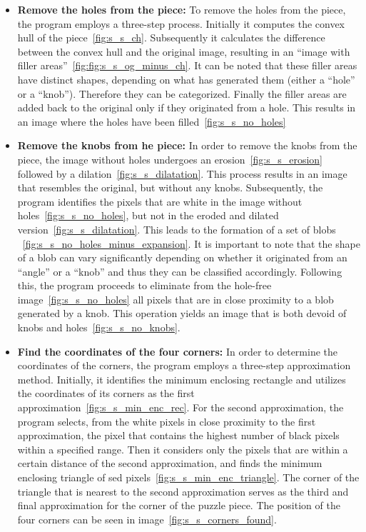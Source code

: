 \documentclass{article}
\begin{document}
\begin{itemize}

  \item \textbf{Remove the holes from the piece:}\newline
  To remove the holes from the piece, the program employs a three-step process. Initially it
  computes the convex hull of the piece~\ref{fig:s_s_ch}.
  Subsequently it calculates the difference between the convex hull and the original image,
  resulting in an ``image with filler areas''~\ref{fig:fig:s_s_og_minus_ch}.
  It can be noted that these filler areas have distinct shapes,
  depending on what has generated them (either a ``hole'' or a ``knob'').
  Therefore they can be categorized.
  Finally the filler areas are added back to the original only if
  they originated from a hole. This results in an image where the holes
  have been filled~\ref{fig:s_s_no_holes}

  \item \textbf{Remove the knobs from he piece:}\newline
  In order to remove the knobs from the piece, the image without holes
  undergoes an erosion~\ref{fig:s_s_erosion} followed by a dilation~\ref{fig:s_s_dilatation}.
  This process results in an image that resembles the original, but without any knobs.
  Subsequently, the program identifies the pixels that are white in the image without holes~\ref{fig:s_s_no_holes},
  but not in the eroded and dilated version~\ref{fig:s_s_dilatation}.
  This leads to the formation of a set of blobs ~\ref{fig:s_s_no_holes_minus_expansion}.
  It is important to note that the shape of a blob can vary significantly depending on whether it originated
  from an ``angle'' or a ``knob'' and thus they can be classified accordingly.
  Following this, the program proceeds to eliminate from the hole-free
  image~\ref{fig:s_s_no_holes} all pixels that are in close proximity to a blob generated by a knob.
  This operation yields an image that is both devoid of knobs and holes~\ref{fig:s_s_no_knobs}.
  
  \item \textbf{Find the coordinates of the four corners:}\newline
  In order to determine the coordinates of the corners,
  the program employs a three-step approximation method.
  Initially, it identifies the minimum enclosing rectangle and
  utilizes the coordinates of its corners
  as the first approximation~\ref{fig:s_s_min_enc_rec}.\newline
  For the second approximation, the program selects,
  from the white pixels in close proximity to the first approximation,
  the pixel that contains the highest number of black pixels
  within a specified range.
  Then it considers only the pixels that are within a certain
  distance of the second approximation, and finds the minimum
  enclosing triangle of sed pixels~\ref{fig:s_s_min_enc_triangle}.\newline
  The corner of the triangle that is nearest to the second
  approximation serves as the third and final approximation
  for the corner of the puzzle piece.
  The position of the four corners can be seen in image~\ref{fig:s_s_corners_found}.


\end{itemize}
\end{document}
